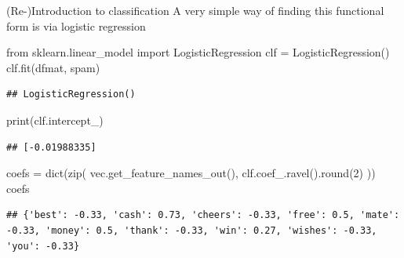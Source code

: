 \documentclass[
  10pt,
  ignorenonframetext,
  aspectratio=169]{beamer}
\newenvironment{Shaded}{\begin{snugshade}}{\end{snugshade}}
\newcommand{\BuiltInTok}[1]{\textcolor[rgb]{0.80,0.80,0.80}{#1}}
\newcommand{\DecValTok}[1]{\textcolor[rgb]{0.86,0.86,0.80}{#1}}
\newcommand{\ImportTok}[1]{\textcolor[rgb]{0.80,0.80,0.80}{#1}}
\newcommand{\NormalTok}[1]{\textcolor[rgb]{0.80,0.80,0.80}{#1}}
\newcommand{\OperatorTok}[1]{\textcolor[rgb]{0.94,0.94,0.82}{#1}}
\begin{document}
\begin{frame}[fragile]{(Re-)Introduction to classification}
\protect\hypertarget{re-introduction-to-classification-1}{}
A very simple way of finding this functional form is via logistic
regression

\medskip
\scriptsize

\begin{Shaded}
\begin{Highlighting}[]
\ImportTok{from}\NormalTok{ sklearn.linear\_model }\ImportTok{import}\NormalTok{ LogisticRegression}
\NormalTok{clf }\OperatorTok{=}\NormalTok{ LogisticRegression()}
\NormalTok{clf.fit(dfmat, spam)}
\end{Highlighting}
\end{Shaded}

\begin{verbatim}
## LogisticRegression()
\end{verbatim}

\begin{Shaded}
\begin{Highlighting}[]
\BuiltInTok{print}\NormalTok{(clf.intercept\_)}
\end{Highlighting}
\end{Shaded}

\begin{verbatim}
## [-0.01988335]
\end{verbatim}

\begin{Shaded}
\begin{Highlighting}[]
\NormalTok{coefs }\OperatorTok{=} \BuiltInTok{dict}\NormalTok{(}\BuiltInTok{zip}\NormalTok{(}
\NormalTok{  vec.get\_feature\_names\_out(),}
\NormalTok{  clf.coef\_.ravel().}\BuiltInTok{round}\NormalTok{(}\DecValTok{2}\NormalTok{)}
\NormalTok{))}
\NormalTok{coefs}
\end{Highlighting}
\end{Shaded}

\begin{verbatim}
## {'best': -0.33, 'cash': 0.73, 'cheers': -0.33, 'free': 0.5, 'mate': -0.33, 'money': 0.5, 'thank': -0.33, 'win': 0.27, 'wishes': -0.33, 'you': -0.33}
\end{verbatim}
\end{frame}
\end{document}
